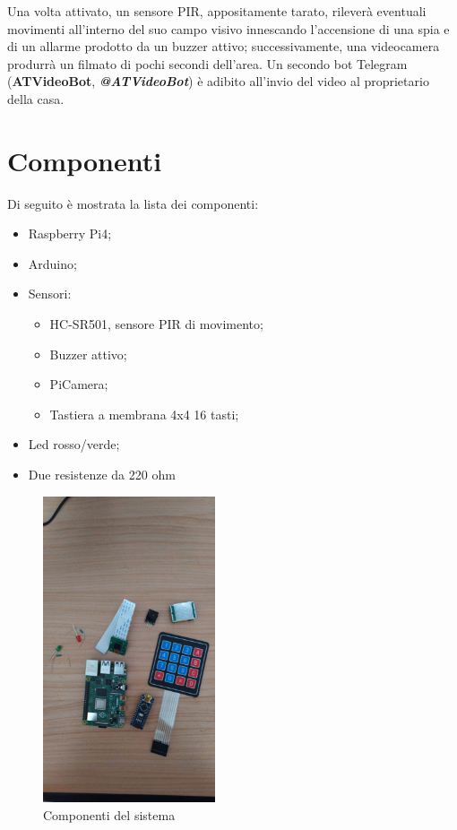 \documentclass[12pt]{article}
\begin{document}
	Una volta attivato, un sensore PIR, appositamente tarato, rileverà eventuali movimenti 
	all'interno del suo campo visivo innescando l'accensione di una spia e di un allarme prodotto 
	da un buzzer attivo; successivamente, una videocamera produrrà un filmato di pochi secondi 
	dell'area. Un secondo bot Telegram (\textbf{ATVideoBot}, \textbf{\textit{@ATVideoBot}}) 
	è adibito all'invio del video al proprietario della casa. 
	\clearpage

	\section{Componenti}
	Di seguito è mostrata la lista dei componenti:
	\begin{itemize}
		\item Raspberry Pi4;
		\item Arduino;
		\item Sensori:	
		\begin{itemize}
			\item HC-SR501, sensore PIR di movimento;
			\item Buzzer attivo;
			\item PiCamera;
			\item Tastiera a membrana 4x4 16 tasti;
		\end{itemize}
		\item Led rosso/verde;
		\item Due resistenze da 220 ohm
	\end{itemize}
	
	\begin{figure}[h]
		\centering
		\includegraphics[width=2.0in]{componenti}
		\caption{Componenti del sistema}
	\end{figure}
\end{document}
